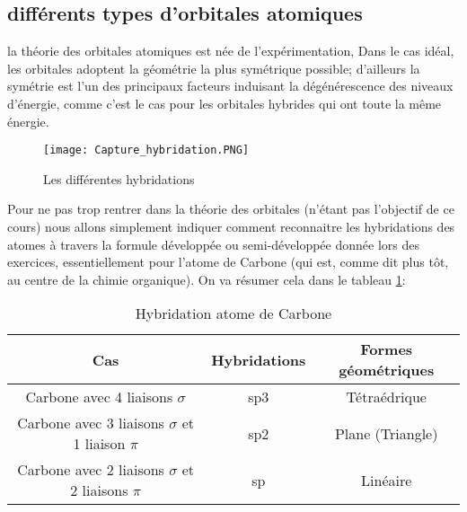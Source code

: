 \documentclass[a4paper, oneside]{book}
\begin{document}
\subsection{différents types d'orbitales atomiques}
la théorie des orbitales atomiques est née de l'expérimentation, Dans le cas idéal, les orbitales adoptent la géométrie la plus symétrique possible; d'ailleurs la symétrie est l'un des principaux facteurs induisant la dégénérescence des niveaux d'énergie, comme c'est le cas pour les orbitales hybrides qui ont toute la même énergie.
\begin{figure}[!h]
    \begin{center}
        \texttt{[image: Capture\_hybridation.PNG]} 
    \end{center}
    \caption{Les différentes hybridations}
    \label{fig:hybridation}
\end{figure}
Pour ne pas trop rentrer dans la théorie des orbitales (n'étant pas l'objectif de ce cours) nous allons simplement indiquer comment reconnaitre les hybridations des atomes à travers la formule développée ou semi-développée donnée lors des exercices, essentiellement pour l'atome de Carbone (qui est, comme dit plus tôt, au centre de la chimie organique). On va résumer cela dans le tableau \ref{tab_hybridation}:
\begin{table}[!ht]
    \begin{center}
        \begin{tabular}{|c|c|c|}
            \hline
            \textbf{Cas} & \textbf{Hybridations} & \textbf{Formes géométriques} \\
            \hline
            Carbone avec 4 liaisons $\sigma$ & sp3 & Tétraédrique \\
            \hline
            Carbone avec 3 liaisons $\sigma$ et 1 liaison $\pi$ & sp2 & Plane (Triangle)\\
            \hline
            Carbone avec 2 liaisons $\sigma$  et 2 liaisons $\pi$ & sp & Linéaire\\
            \hline
        \end{tabular} 
    \end{center}
    \caption{Hybridation atome de Carbone}
    \label{tab_hybridation}
\end{table}
\end{document}
